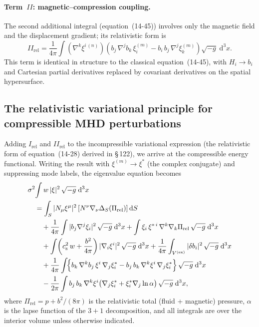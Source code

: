 \paragraph{Term~$\boldsymbol{\mathit{II}}$: magnetic--compression coupling.}
The second additional integral (equation~(14-45)) involves only the
magnetic field and the displacement gradient; its relativistic form is
\begin{equation}\label{eq:rel-14-II}
  \mathit{II}_{\mathrm{rel}}
  = \frac{1}{4\pi}\int
    (\nabla^{k}\xi^{i\,(n)})\!
    \left(b_{j}\,\nabla^{j}b_{k}\,\xi_{i}^{(m)}
    - b_{i}\,b_{j}\,\nabla^{j}\xi_{k}^{(m)}\right)
    \sqrt{-g}\;\mathrm{d}^{3}x.
\end{equation}
This term is identical in structure to the classical
equation~(14-45), with $H_{i}\to b_{i}$ and Cartesian partial
derivatives replaced by covariant derivatives on the spatial
hypersurface.

\subsection{The relativistic variational principle for compressible
  MHD perturbations}\label{sec:rel-123c}

Adding $I_{\mathrm{rel}}$ and $\mathit{II}_{\mathrm{rel}}$ to the
incompressible variational expression (the relativistic form of
equation~(14-28) derived in \S\,122), we arrive at the compressible
energy functional.  Writing the result with
$\xi^{(m)} \to \xi^{*}$ (the complex conjugate) and suppressing
mode labels, the eigenvalue equation becomes
\begin{align}\label{eq:rel-14-57}
  &\sigma^{2}\!\int w\,|\xi|^{2}\,
    \sqrt{-g}\;\mathrm{d}^{3}x
  \notag\\
  &\quad
  = \int_{S}
    |N_{\mu}\xi^{\mu}|^{2}\,
    [N^{\nu}\nabla_{\nu}\Delta_{S}(\Pi_{\mathrm{rel}})]\,
    \mathrm{d}S
  \notag\\
  &\quad\quad
  + \frac{1}{4\pi}\int
    |b_{j}\nabla^{j}\xi_{i}|^{2}\,
    \sqrt{-g}\;\mathrm{d}^{3}x
  + \int \xi_{i}\,\xi^{*\,i}\,
    \nabla^{k}\nabla_{k}\Pi_{\mathrm{rel}}\,
    \sqrt{-g}\;\mathrm{d}^{3}x
  \notag\\
  &\quad\quad
  + \int \!\left(c_{\mathrm{s}}^{2}\,w
    + \frac{b^{2}}{4\pi}\right)
    |\nabla_{i}\xi^{i}|^{2}\,
    \sqrt{-g}\;\mathrm{d}^{3}x
  + \frac{1}{4\pi}\int_{V^{(\mathrm{ex})}}
    |\delta b_{i}|^{2}\,
    \sqrt{-g}\;\mathrm{d}^{3}x
  \notag\\
  &\quad\quad
  + \frac{1}{4\pi}\int\!
    \Bigl\{b_{k}\,\nabla^{k}b_{j}\,
      \xi^{i}\,\nabla_{j}\xi_{i}^{*}
    - b_{j}\,b_{k}\,
      \nabla^{k}\xi^{i}\,\nabla_{j}\xi_{i}^{*}
    \Bigr\}\,\sqrt{-g}\;\mathrm{d}^{3}x
  \notag\\
  &\quad\quad
  - \frac{1}{2\pi}\int
    b_{j}\,b_{k}\,\nabla^{k}\xi^{i}
    \bigl(\nabla_{j}\xi_{i}^{*}
    + \xi_{i}^{*}\nabla_{j}\ln\alpha\bigr)\,
    \sqrt{-g}\;\mathrm{d}^{3}x,
\end{align}
where $\Pi_{\mathrm{rel}} = p + b^{2}/(8\pi)$ is the relativistic
total (fluid + magnetic) pressure, $\alpha$ is the lapse function of
the $3+1$ decomposition, and all integrals are over the interior
volume unless otherwise indicated.

